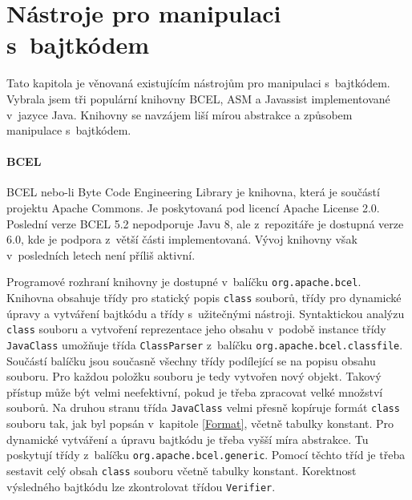 \chapter{Nástroje pro manipulaci s~bajtkódem}\label{Tools}

Tato kapitola je věnovaná existujícím nástrojům pro manipulaci s~bajtkódem. Vybrala jsem tři populární knihovny BCEL, ASM a Javassist implementované v~jazyce Java. Knihovny se navzájem liší mírou abstrakce a způsobem manipulace s~bajtkódem.


\subsubsection{BCEL}\label{ToolsBCEL}



BCEL nebo-li Byte Code Engineering Library \cite{BCEL} je knihovna, která je součástí projektu Apache Commons. Je poskytovaná pod licencí Apache License 2.0. Poslední verze BCEL 5.2 nepodporuje Javu 8, ale z~repozitáře je dostupná verze 6.0, kde je podpora z~větší části implementovaná. Vývoj knihovny však v~posledních letech není příliš aktivní. 

Programové rozhraní knihovny je dostupné v~balíčku \texttt{org.apache.bcel}. Knihovna obsahuje třídy pro statický popis \texttt{class} souborů, třídy pro dynamické úpravy a vytváření bajtkódu a třídy s~užitečnými nástroji. Syntaktickou analýzu \texttt{class} souboru a vytvoření reprezentace jeho obsahu v~podobě instance třídy \texttt{JavaClass} umožňuje třída \texttt{ClassParser} z~balíčku \texttt{org.apache.bcel.classfile}. Součástí balíčku jsou současně všechny třídy podílející se na popisu obsahu souboru. Pro každou položku souboru je tedy vytvořen nový objekt. Takový přístup může být velmi neefektivní, pokud je třeba zpracovat velké množství souborů. Na druhou stranu třída \texttt{JavaClass} velmi přesně kopíruje formát \texttt{class} souboru tak, jak byl popsán v~kapitole \ref{Format}, včetně tabulky konstant.
Pro dynamické vytváření a úpravu bajtkódu je třeba vyšší míra abstrakce. Tu poskytují třídy z~balíčku \texttt{org.apache.bcel.generic}. Pomocí těchto tříd je třeba sestavit celý obsah \texttt{class} souboru včetně tabulky konstant. Korektnost výsledného bajtkódu lze zkontrolovat třídou \texttt{Verifier}.


